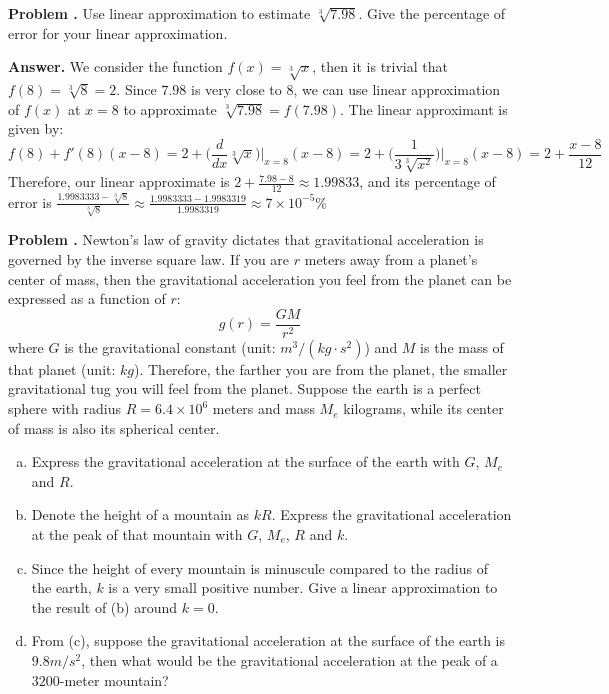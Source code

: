 \documentclass[11pt,letterpaper]{article}
\newcounter{problem}
\newcommand{\problem}{
	\stepcounter{problem}%
	\noindent \textbf{Problem \theproblem. }%
}
\newcommand{\answer}{\noindent \textbf{Answer. }}
\begin{document}
\problem Use linear approximation to estimate $\sqrt[3]{7.98}$.  Give the percentage of error for your linear approximation. \vspace{6mm}

\answer We consider the function $f(x) = \sqrt[3]{x}$, then it is trivial that $f(8) = \sqrt[3]{8} = 2$.  Since $7.98$ is very close to $8$, we can use linear approximation of $f(x)$ at $x=8$ to approximate $\sqrt[3]{7.98} = f(7.98)$.  The linear approximant is given by:
\[f(8) + f'(8)(x-8) = 2 + \Big(\frac{d}{dx}\sqrt[3]{x}\Big)\Big|_{x=8}(x-8) = 2 + \Big(\frac{1}{3\sqrt[3]{x^2}}\Big)\Big|_{x=8}(x-8) = 2 + \frac{x-8}{12}\]
Therefore, our linear approximate is $2 + \frac{7.98-8}{12} \approx 1.99833$, and its percentage of error is $\frac{1.9983333-\sqrt[3]{8}}{\sqrt[3]{8}} \approx \frac{1.9983333-1.9983319}{1.9983319} \approx 7 \times 10^{-5}\%$
\vspace{6mm}

\problem Newton's law of gravity dictates that gravitational acceleration is governed by the inverse square law.  If you are $r$ meters away from a planet's center of mass, then the gravitational acceleration you feel from the planet can be expressed as a function of $r$:
\[g(r) = \frac{GM}{r^2}\]
where $G$ is the gravitational constant (unit: $m^3/(kg \cdot s^2)$) and $M$ is the mass of that planet (unit: $kg$).  Therefore, the farther you are from the planet, the smaller gravitational tug you will feel from the planet.  Suppose the earth is a perfect sphere with radius $R = 6.4 \times 10^{6}$ meters and mass $M_e$ kilograms, while its center of mass is also its spherical center.
\begin{enumerate}[(a)]
    \item Express the gravitational acceleration at the surface of the earth with $G$, $M_e$ and $R$.
    \item Denote the height of a mountain as $kR$.  Express the gravitational acceleration at the peak of that mountain with $G$, $M_e$, $R$ and $k$.
    \item Since the height of every mountain is minuscule compared to the radius of the earth, $k$ is a very small positive number.  Give a linear approximation to the result of (b) around $k = 0$.
    \item From (c), suppose the gravitational acceleration at the surface of the earth is $9.8 m/s^2$, then what would be the gravitational acceleration at the peak of a $3200$-meter mountain?
\end{enumerate}
\vspace{6mm}
\end{document}
